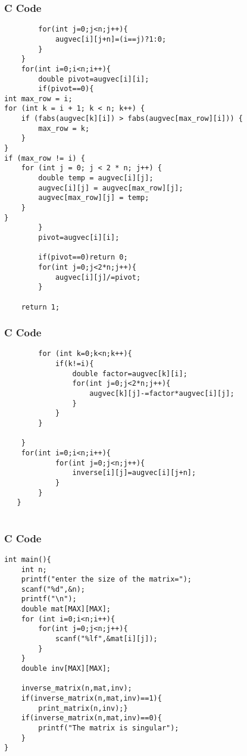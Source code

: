 \documentclass{beamer}
\begin{document}
\begin{frame}[fragile]
    \frametitle{C Code }
    \begin{lstlisting}
        for(int j=0;j<n;j++){
            augvec[i][j+n]=(i==j)?1:0;
        }
    }
    for(int i=0;i<n;i++){
        double pivot=augvec[i][i];
        if(pivot==0){
int max_row = i;
for (int k = i + 1; k < n; k++) {
    if (fabs(augvec[k][i]) > fabs(augvec[max_row][i])) {
        max_row = k;
    }
}
if (max_row != i) {
    for (int j = 0; j < 2 * n; j++) {
        double temp = augvec[i][j];
        augvec[i][j] = augvec[max_row][j];
        augvec[max_row][j] = temp;
    }
}
        }
        pivot=augvec[i][i];
        
        if(pivot==0)return 0;
        for(int j=0;j<2*n;j++){
            augvec[i][j]/=pivot;
        }

    return 1;
\end{lstlisting}
\end{frame}

\begin{frame}[fragile]
    \frametitle{C Code }
    \begin{lstlisting}
        for (int k=0;k<n;k++){
            if(k!=i){
                double factor=augvec[k][i];
                for(int j=0;j<2*n;j++){
                    augvec[k][j]-=factor*augvec[i][j];
                }
            }
        }
        
    }
    for(int i=0;i<n;i++){
            for(int j=0;j<n;j++){
                inverse[i][j]=augvec[i][j+n];
            }
        }
   }


\end{lstlisting}
\end{frame}
\begin{frame}[fragile]
    \frametitle{C Code }
    \begin{lstlisting}
int main(){
    int n;
    printf("enter the size of the matrix=");
    scanf("%d",&n);
    printf("\n");
    double mat[MAX][MAX];
    for (int i=0;i<n;i++){
        for(int j=0;j<n;j++){
            scanf("%lf",&mat[i][j]);
        }
    }
    double inv[MAX][MAX];
    
    inverse_matrix(n,mat,inv);
    if(inverse_matrix(n,mat,inv)==1){
        print_matrix(n,inv);}
    if(inverse_matrix(n,mat,inv)==0){
        printf("The matrix is singular");
    }
}

\end{lstlisting}
\end{frame}
\end{document}
